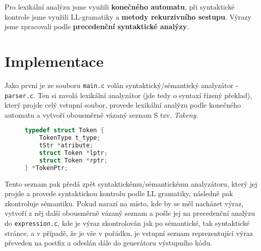 \documentclass[czech,a4paper,12pt]{article}[]
\begin{document}
\smallskip
Pro lexikální analýzu jsme využili \textbf{konečného automatu}, při syntaktické kontrole jsme využili LL-gramatiky a \textbf{metody rekurzivního sestupu}. Výrazy jsme zpracovali podle \textbf{precedenční syntaktické analýzy}.


\section{Implementace}
Jako první je ze souboru \texttt{main.c} volán syntaktický/sémantický analyzátor - \texttt{parser.c}. Ten si zavolá lexikální analyzátor (jde tedy o syntaxí řízený překlad), který projde celý vstupní soubor, provede lexikální analýzu podle konečného automatu a vytvoří obousměrně vázaný seznam S tzv. \emph{Tokeny}. 

\begin{figure}[h!]
    \begin{lstlisting}[language=C, caption={Implementace struktury tokenu}, captionpos=b]
typedef struct Token {
    TokenType t_type;
    tStr *atribute;
    struct Token *lptr;
    struct Token *rptr;
} *TokenPtr;
    \end{lstlisting}
\label{tokenCode}
\end{figure}

Tento seznam pak předá zpět syntaktickému/sémantickému analyzátoru, který jej projde a provede syntaktickou kontrolu podle LL gramatiky, následně pak zkontroluje sémantiku. Pokud narazí na místo, kde by se měl nacházet výraz, vytvoří z něj další obousměrně vázaný seznam a pošle jej na precedenční analýzu do \texttt{expression.c}, kde je výraz zkontrolován jak po sémantické, tak syntaktické stránce, a v případě, že je vše v pořádku, je vstupní seznam reprezentující výraz převeden na postfix a odeslán dále do generátoru výstupního kódu.

\newpage
\end{document}
